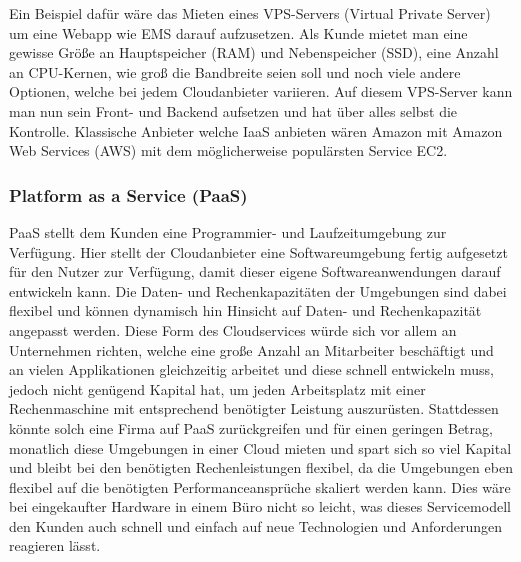 Ein Beispiel dafür wäre das Mieten eines VPS-Servers (Virtual Private Server) um eine Webapp wie EMS darauf aufzusetzen.
Als Kunde mietet man eine gewisse Größe an Hauptspeicher (RAM) und Nebenspeicher (SSD), eine Anzahl an CPU-Kernen, wie groß die Bandbreite seien soll und noch viele andere Optionen, welche bei jedem Cloudanbieter variieren. Auf diesem VPS-Server kann man nun sein Front- und Backend aufsetzen und hat über alles selbst die Kontrolle. Klassische Anbieter welche IaaS anbieten wären Amazon mit Amazon Web Services (AWS) mit dem möglicherweise populärsten Service EC2.


\subsubsection{Platform as a Service (PaaS)}
PaaS stellt dem Kunden eine Programmier- und Laufzeitumgebung zur Verfügung. Hier stellt der Cloudanbieter eine Softwareumgebung fertig aufgesetzt für den Nutzer zur Verfügung, damit dieser eigene Softwareanwendungen darauf entwickeln kann. Die Daten- und Rechenkapazitäten der Umgebungen sind dabei flexibel und können dynamisch hin Hinsicht auf Daten- und Rechenkapazität angepasst werden.\newline
\newline
Diese Form des Cloudservices würde sich vor allem an Unternehmen richten, welche eine große Anzahl an Mitarbeiter beschäftigt und an vielen Applikationen gleichzeitig arbeitet und diese schnell entwickeln muss, jedoch nicht genügend Kapital hat, um jeden Arbeitsplatz mit einer Rechenmaschine mit entsprechend benötigter Leistung auszurüsten. Stattdessen könnte solch eine Firma auf PaaS zurückgreifen und für einen geringen Betrag, monatlich diese Umgebungen in einer Cloud mieten und spart sich so viel Kapital und bleibt bei den benötigten Rechenleistungen flexibel, da die Umgebungen eben flexibel auf die benötigten Performanceansprüche skaliert werden kann. Dies wäre bei eingekaufter Hardware in einem Büro nicht so leicht, was dieses Servicemodell den Kunden auch schnell und einfach auf neue Technologien und Anforderungen reagieren lässt.


